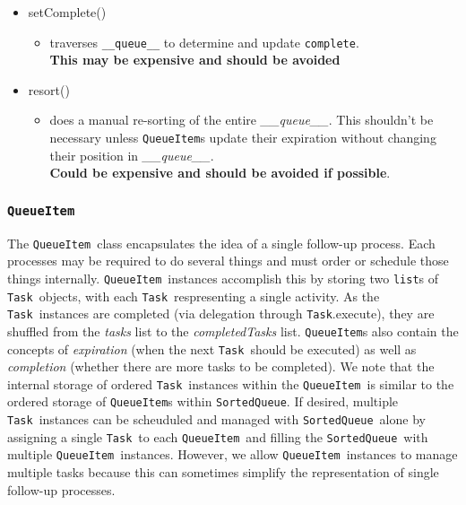 \documentclass{article}
\newcommand{\SortedQueue}{\texttt{SortedQueue}}
\newcommand{\QueueItem}{\texttt{QueueItem}}
\newcommand{\Task}{\texttt{Task}}
\newcommand{\pythonlist}{\texttt{list}}
\begin{document}
\begin{itemize}
{\begin{itemize}
        \end{itemize}
         }
    \item{setComplete()
        \begin{itemize}
            \item{traverses \texttt{\_\_queue\_\_} to determine and update \texttt{complete}. \\ \textbf{This may be expensive and should be avoided}}
        \end{itemize}
         }
    \item{resort()
        \begin{itemize}
            \item{does a manual re-sorting of the entire \textit{\_\_queue\_\_}. This shouldn't be necessary unless {\QueueItem}s update their expiration without changing their position in \textit{\_\_queue\_\_}. \\ \textbf{Could be expensive and should be avoided if possible}.}
        \end{itemize}
         }
\end{itemize}



\subsubsection{\QueueItem}
\label{sec: QueueItem}

The \QueueItem~class encapsulates the idea of a single follow-up process.
Each processes may be required to do several things and must order or schedule those things internally.
\QueueItem~instances accomplish this by storing two {\pythonlist}s of \Task~objects, with each \Task~respresenting a single activity.
As the \Task~instances are completed (via delegation through \Task.execute), they are shuffled from the \textit{tasks} list to the \textit{completedTasks} list.
{\QueueItem}s also contain the concepts of \textit{expiration} (when the next \Task~should be executed) as well as \textit{completion} (whether there are more tasks to be completed).
We note that the internal storage of ordered \Task~instances within the \QueueItem~is similar to the ordered storage of {\QueueItem}s within \SortedQueue.
If desired, multiple \Task~instances can be scheuduled and managed with \SortedQueue~alone by assigning a single \Task~to each \QueueItem~and filling the \SortedQueue~with multiple \QueueItem~instances.
However, we allow \QueueItem~instances to manage multiple tasks because this can sometimes simplify the representation of single follow-up processes.
\end{document}
